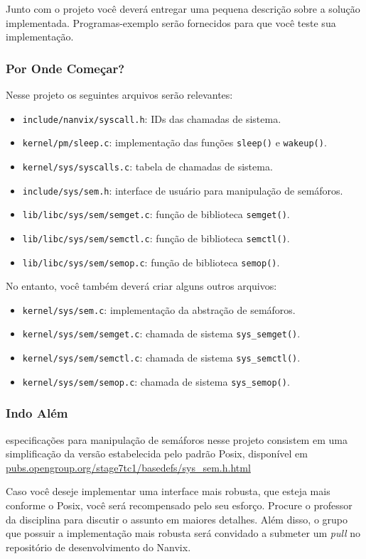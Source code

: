 \documentclass[11pt]{article}
\begin{document}
Junto com o projeto você deverá entregar uma pequena descrição sobre a solução implementada. Programas-exemplo serão fornecidos para que você teste sua implementação.

\subsubsection*{Por Onde Começar?}

Nesse projeto os seguintes arquivos serão relevantes:

\begin{itemize}
    \item \texttt{include/nanvix/syscall.h}: IDs das chamadas de sistema.
    \item \texttt{kernel/pm/sleep.c}: implementação das funções \texttt{sleep()} e \texttt{wakeup()}.
    \item \texttt{kernel/sys/syscalls.c}: tabela de chamadas de sistema.
    \item \texttt{include/sys/sem.h}: interface de usuário para manipulação de semáforos.
    \item \texttt{lib/libc/sys/sem/semget.c}: função de biblioteca \texttt{semget()}.
    \item \texttt{lib/libc/sys/sem/semctl.c}: função de biblioteca \texttt{semctl()}.
    \item \texttt{lib/libc/sys/sem/semop.c}: função de biblioteca \texttt{semop()}.
\end{itemize}

No entanto, você também deverá criar alguns outros arquivos:

\begin{itemize}
    \item \texttt{kernel/sys/sem.c}: implementação da abstração de semáforos.
    \item \texttt{kernel/sys/sem/semget.c}: chamada de sistema \texttt{sys\_semget()}.
    \item \texttt{kernel/sys/sem/semctl.c}: chamada de sistema \texttt{sys\_semctl()}.
    \item \texttt{kernel/sys/sem/semop.c}: chamada de sistema \texttt{sys\_semop()}.
\end{itemize}

\subsubsection*{Indo Além}

especificações para manipulação de semáforos nesse projeto consistem em uma simplificação da versão estabelecida pelo padrão Posix, disponível em \url{pubs.opengroup.org/stage7tc1/basedefs/sys\_sem.h.html} 

Caso você deseje implementar uma interface mais robusta, que esteja mais conforme o Posix, você será recompensado pelo seu esforço. Procure o professor da disciplina para discutir o assunto em maiores detalhes. Além disso, o grupo que possuir a implementação mais robusta será convidado a submeter um \textit{pull} no repositório de desenvolvimento do Nanvix.
\end{document}
